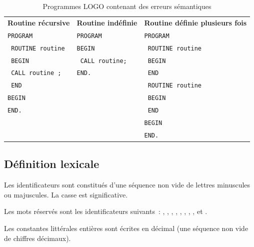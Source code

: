 \begin{table}[t]
  \centering
  \small
  \begin{tabular}{l|l|l}
  \textbf{Routine récursive}    &  \textbf{Routine indéfinie}    &  \textbf{Routine définie plusieurs fois} \\
  \texttt{PROGRAM}              &  \texttt{PROGRAM}              &  \texttt{PROGRAM}               \\
  \texttt{  ROUTINE routine}    &  \texttt{BEGIN}                &  \texttt{  ROUTINE routine}     \\
  \texttt{  BEGIN}              &  \texttt{  CALL routine;}      &  \texttt{  BEGIN}               \\
  \texttt{    CALL routine ;}   &  \texttt{END.}                 &  \texttt{  END}                 \\
  \texttt{  END}                &                                &  \texttt{  ROUTINE routine}     \\
  \texttt{BEGIN}                &                                &  \texttt{  BEGIN}               \\
  \texttt{END.}                 &                                &  \texttt{  END}                 \\
                                &                                &  \texttt{BEGIN}                 \\
                                &                                &  \texttt{END.}                  \\
  \end{tabular}
  \caption{Programmes LOGO contenant des erreurs sémantiques}
  \ligne
\end{table}


\subsection{Définition lexicale}

Les identificateurs sont constitués d'une séquence non vide de lettres minuscules ou majuscules. La casse est significative.

Les mots réservés sont les identificateurs suivants~: , , , , , , , ,  et .

Les constantes littérales entières sont écrites en décimal (une séquence non vide de chiffres décimaux).

